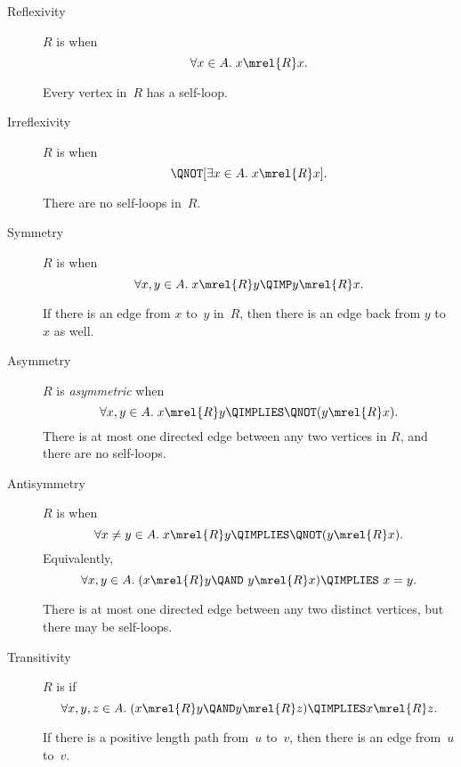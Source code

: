 \begin{description}

\item[Reflexivity]

$R$ is  when
\[
\forall x \in A. \; x \mrel{R} x.
\]


Every vertex in~$R$ has a self-loop.

\item[Irreflexivity]

$R$ is  when
\[
\QNOT[ \exists x \in A. \; x \mrel{R} x].
\]


There are no self-loops in~$R$.

\item[Symmetry]

$R$ is  when
\[
\forall x, y \in A. \; x \mrel{R} y \QIMP y \mrel{R} x.
\]


If there is an edge from $x$ to~$y$ in~$R$, then there is an edge back
from $y$ to~$x$ as well.

\item[Asymmetry]
$R$ is \emph{asymmetric} when
\[
\forall x, y \in A. \; x \mrel{R} y \QIMPLIES \QNOT( y \mrel{R} x ).
\]
There is at most one directed edge between any two vertices in $R$,
and there are no self-loops.

\item[Antisymmetry]
$R$ is  when
\[
\forall x \neq y \in A. \; x \mrel{R} y \QIMPLIES \QNOT( y \mrel{R} x ).
\]
Equivalently,
\[
\forall x, y \in A. \; (x \mrel{R} y \QAND\ y \mrel{R} x ) \QIMPLIES\ x = y.
\]

There is at most one directed edge between any two distinct vertices,
but there may be self-loops.

\item[Transitivity]
$R$ is  if
\[
 \forall x, y, z \in A. \; (x \mrel{R} y \QAND y \mrel{R} z) \QIMPLIES x \mrel{R} z.
\]

If there is a positive length path from~$u$ to~$v$, then there is an edge from~$u$ to~$v$.

\iffalse
For any walk $v_0, v_1, \dots, v_k$ in~$G$ where $k \ge 2$,
$\diredge{v_0}{v_k}$ is in~$G$ (and, hence, $\diredge{v_i}{v_j}$ is
also in~$G$ for all $i < j$.
\fi


\end{description}
